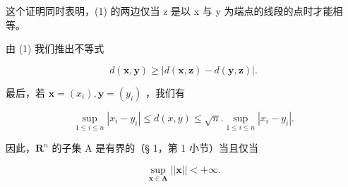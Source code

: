 这个证明同时表明，(1) 的两边仅当 z 是以 x 与 y 为端点的线段的点时才能相等。

由 (1) 我们推出不等式

\[
d (\boldsymbol {x}, \boldsymbol {y}) \geqslant | d (\boldsymbol {x}, \boldsymbol {z}) - d (\boldsymbol {y}, \boldsymbol {z}) |.\tag{2}
\]

最后，若 \(\pmb{x} = (x_{i}),\pmb{y} = (y_{i})\) ，我们有

\[
\sup _ {1 \leqslant i \leqslant n} | x _ {i} - y _ {i} | \leqslant d (x, y) \leqslant \sqrt {n}. \sup _ {1 \leqslant i \leqslant n} | x _ {i} - y _ {i} |.\tag{3}
\]

因此，\(\mathbf{R}^n\) 的子集 A 是有界的（§ 1，第 1 小节）当且仅当

\[
\sup _ {\boldsymbol {x} \in \mathbf {A}} | | \boldsymbol {x} | | <   + \infty .
\]

